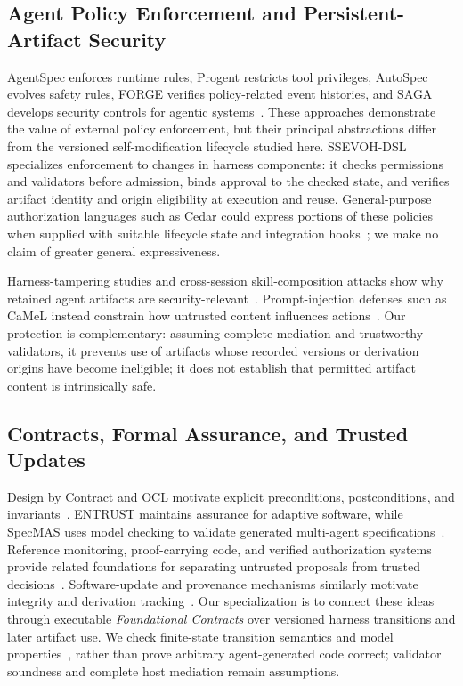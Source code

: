 \documentclass[letterpaper,journal]{IEEEtran}
\newcommand{\tool}{SSEVOH-DSL}
\begin{document}
\subsection{Agent Policy Enforcement and Persistent-Artifact Security}
AgentSpec enforces runtime rules, Progent restricts tool privileges, AutoSpec evolves safety rules, FORGE verifies policy-related event histories, and SAGA develops security controls for agentic systems~\cite{agentspec,progent,autospec,forge,saga}. These approaches demonstrate the value of external policy enforcement, but their principal abstractions differ from the versioned self-modification lifecycle studied here. \tool{} specializes enforcement to changes in harness components: it checks permissions and validators before admission, binds approval to the checked state, and verifies artifact identity and origin eligibility at execution and reuse. General-purpose authorization languages such as Cedar could express portions of these policies when supplied with suitable lifecycle state and integration hooks~\cite{cedar,cedarengineering}; we make no claim of greater general expressiveness.

Harness-tampering studies and cross-session skill-composition attacks show why retained agent artifacts are security-relevant~\cite{tampering,skillrelay}. Prompt-injection defenses such as CaMeL instead constrain how untrusted content influences actions~\cite{camel,greshake}. Our protection is complementary: assuming complete mediation and trustworthy validators, it prevents use of artifacts whose recorded versions or derivation origins have become ineligible; it does not establish that permitted artifact content is intrinsically safe.

\subsection{Contracts, Formal Assurance, and Trusted Updates}
Design by Contract and OCL motivate explicit preconditions, postconditions, and invariants~\cite{meyerdbc,ocl}. ENTRUST maintains assurance for adaptive software, while SpecMAS uses model checking to validate generated multi-agent specifications~\cite{entrust,specmas}. Reference monitoring, proof-carrying code, and verified authorization systems provide related foundations for separating untrusted proposals from trusted decisions~\cite{schneider,necula,cedar}. Software-update and provenance mechanisms similarly motivate integrity and derivation tracking~\cite{tuf,intoto,prov}. Our specialization is to connect these ideas through executable \emph{Foundational Contracts} over versioned harness transitions and later artifact use. We check finite-state transition semantics and model properties~\cite{lamport}, rather than prove arbitrary agent-generated code correct; validator soundness and complete host mediation remain assumptions.
\end{document}

